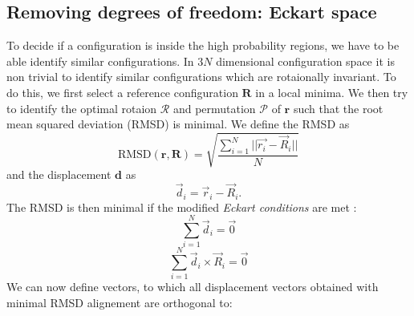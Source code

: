 \documentclass[11pt]{scrartcl} %
\begin{document}
\subsection{Removing degrees of freedom: Eckart space}
To decide if a configuration is inside the high probability regions, we have to be able identify similar configurations. In 3$N$ dimensional configuration space it is non trivial to identify similar configurations which are rotaionally invariant. To do this, we first select a reference configuration $\mathbf{R}$ in a local minima. We then try to identify the optimal rotaion $\mathcal{R}$ and permutation $\mathcal{P}$ of $\mathbf{r}$ such that the root mean squared deviation (RMSD) is minimal. We define the RMSD as
\begin{equation}
	\text{RMSD}(\mathbf{r},\mathbf{R})=\sqrt{\frac{\sum_{i=1}^N ||\vec{r_i}-\vec{R}_i||}{N}}
\end{equation}
and the displacement $\mathbf{d}$ as
\begin{equation}
	\vec{d}_i=\vec{r}_i-\vec{R}_i.
\end{equation}
The RMSD is then minimal if the modified \emph{Eckart conditions} are met \cite{Kudin2005}:
\begin{equation}
	\sum_{i=1}^N \vec{d}_i= \vec{0}
	\label{eq:1}
\end{equation}
\begin{equation}
	\sum_{i=1}^N \vec{d}_i\times \vec{R}_i = \vec{0}
	\label{eq:2}
\end{equation}
We can now define vectors, to which all displacement vectors obtained with minimal RMSD alignement are orthogonal to:
\end{document}
